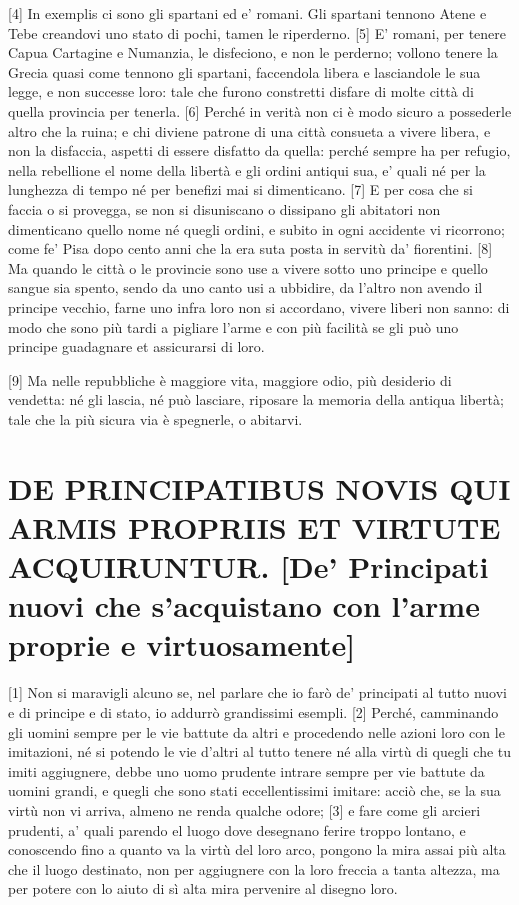{[}4{]} In exemplis ci sono gli spartani ed e' romani. Gli spartani
tennono Atene e Tebe creandovi uno stato di pochi, tamen le riperderno.
{[}5{]} E' romani, per tenere Capua Cartagine e Numanzia, le disfeciono,
e non le perderno; vollono tenere la Grecia quasi come tennono gli
spartani, faccendola libera e lasciandole le sua legge, e non successe
loro: tale che furono constretti disfare di molte città di quella
provincia per tenerla. {[}6{]} Perché in verità non ci è modo sicuro a
possederle altro che la ruina; e chi diviene patrone di una città
consueta a vivere libera, e non la disfaccia, aspetti di essere disfatto
da quella: perché sempre ha per refugio, nella rebellione el nome della
libertà e gli ordini antiqui sua, e' quali né per la lunghezza di tempo
né per benefizi mai si dimenticano. {[}7{]} E per cosa che si faccia o
si provegga, se non si disuniscano o dissipano gli abitatori non
dimenticano quello nome né quegli ordini, e subito in ogni accidente vi
ricorrono; come fe' Pisa dopo cento anni che la era suta posta in
servitù da' fiorentini. {[}8{]} Ma quando le città o le provincie sono
use a vivere sotto uno principe e quello sangue sia spento, sendo da uno
canto usi a ubbidire, da l'altro non avendo il principe vecchio, farne
uno infra loro non si accordano, vivere liberi non sanno: di modo che
sono più tardi a pigliare l'arme e con più facilità se gli può uno
principe guadagnare et assicurarsi di loro.

{[}9{]} Ma nelle repubbliche è maggiore vita, maggiore odio, più
desiderio di vendetta: né gli lascia, né può lasciare, riposare la
memoria della antiqua libertà; tale che la più sicura via è spegnerle, o
abitarvi.

\quebra\section{DE PRINCIPATIBUS NOVIS QUI ARMIS PROPRIIS ET VIRTUTE ACQUIRUNTUR.
{[}De' Principati nuovi che s'acquistano con l'arme proprie e virtuosamente{]}}

{[}1{]} Non si maravigli alcuno se, nel parlare che io farò de'
principati al tutto nuovi e di principe e di stato, io addurrò
grandissimi esempli. {[}2{]} Perché, camminando gli uomini sempre per le
vie battute da altri e procedendo nelle azioni loro con le imitazioni,
né si potendo le vie d'altri al tutto tenere né alla virtù di quegli che
tu imiti aggiugnere, debbe uno uomo prudente intrare sempre per vie
battute da uomini grandi, e quegli che sono stati eccellentissimi
imitare: acciò che, se la sua virtù non vi arriva, almeno ne renda
qualche odore; {[}3{]} e fare come gli arcieri prudenti, a' quali
parendo el luogo dove desegnano ferire troppo lontano, e conoscendo fino
a quanto va la virtù del loro arco, pongono la mira assai più alta che
il luogo destinato, non per aggiugnere con la loro freccia a tanta
altezza, ma per potere con lo aiuto di sì alta mira pervenire al disegno
loro.

